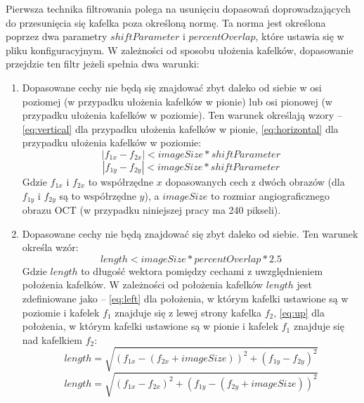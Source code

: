 Pierwsza technika filtrowania polega na usunięciu dopasowań doprowadzających do przesunięcia się kafelka poza określoną normę. Ta norma jest określona poprzez dwa parametry $shiftParameter$ i $percentOverlap$, które ustawia się w pliku konfiguracyjnym. W zależności od sposobu ułożenia kafelków, dopasowanie przejdzie ten filtr jeżeli spełnia dwa warunki:

\begin{enumerate}
\item Dopasowane cechy nie będą się znajdować zbyt daleko od siebie w osi poziomej (w przypadku ułożenia kafelków w pionie) lub osi pionowej (w przypadku ułożenia kafelków w poziomie). Ten warunek określają wzory -- \ref{eq:vertical} dla przypadku ułożenia kafelków w pionie, \ref{eq:horizontal} dla przypadku ułożenia kafelków w poziomie:
\begin{equation}
\left|f_{1x} - f_{2x}\right| < imageSize * shiftParameter
\label{eq:vertical}
\end{equation}
\begin{equation}
\left|f_{1y} - f_{2y}\right| < imageSize * shiftParameter
\label{eq:horizontal}
\end{equation}
Gdzie $f_{1x}$ i $f_{2x}$ to współrzędne $x$ dopasowanych cech z dwóch obrazów (dla $f_{1y}$ i $f_{2y}$ są to współrzędne $y$), a $imageSize$ to rozmiar angiograficznego obrazu OCT (w przypadku niniejszej pracy ma 240 pikseli).
\item Dopasowane cechy nie będą znajdować się zbyt daleko od siebie. Ten warunek określa wzór:
\begin{equation}
length < imageSize * percentOverlap * 2.5
\label{eq:length}
\end{equation}
Gdzie $length$ to długość wektora pomiędzy cechami z uwzględnieniem położenia kafelków. W zależności od położenia kafelków $length$ jest zdefiniowane jako -- \ref{eq:left} dla położenia, w którym kafelki ustawione są w poziomie i kafelek $f_{1}$ znajduje się z lewej strony kafelka $f_{2}$, \ref{eq:up} dla położenia, w którym kafelki ustawione są w pionie i kafelek $f_{1}$ znajduje się nad kafelkiem $f_{2}$:
\begin{equation}
length = \sqrt{(f_{1x} - (f_{2x} + imageSize))^2 + (f_{1y} - f_{2y})^2}
\label{eq:left}
\end{equation}
\begin{equation}
length = \sqrt{(f_{1x} - f_{2x})^2 + (f_{1y} - (f_{2y} + imageSize))^2}
\label{eq:up}
\end{equation}
\end{enumerate}

